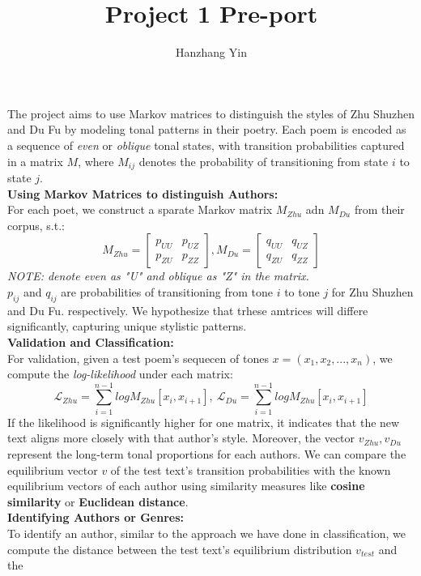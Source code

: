 \documentclass[12pt]{article}
\title{\vspace{-2cm}Project 1 Pre-port}
\author{Hanzhang Yin}
\begin{document}
\maketitle

The project aims to use Markov matrices to distinguish the styles of Zhu Shuzhen and Du Fu by modeling tonal patterns in their poetry.
Each poem is encoded as a sequence of \textit{even} or \textit{oblique} tonal states, with transition probabilities captured in a matrix \( M \), where \( M_{ij} \) denotes the probability of transitioning from state \( i \) to state \( j \).
\\
\textbf{Using Markov Matrices to distinguish Authors: }
\\
For each poet, we construct a sparate Markov matrix $M_{Zhu}$ adn $M_{Du}$ from their corpus, s.t.:
\[ 
    M_{Zhu} = \begin{bmatrix} p_{UU} & p_{UZ} \\ p_{ZU} & p_{ZZ} \end{bmatrix}, M_{Du} = \begin{bmatrix} q_{UU} & q_{UZ} \\ q_{ZU} & q_{ZZ} \end{bmatrix}
\]
\textit{NOTE: denote even as "U" and oblique as "Z" in the matrix.}
\\
$p_{ij}$ and $q_{ij}$ are probabilities of transitioning from tone $i$ to tone $j$ for Zhu Shuzhen and Du Fu. respectively. We hypothesize that trhese amtrices will differe significantly, capturing unique stylistic patterns.
\\
\textbf{Validation and Classification: }
\\
For validation, given a test poem's sequecen of tones $x = (x_1, x_2,...,x_n)$, we compute the \textit{log-likelihood} under each matrix:
\[ \mathcal{L}_{Zhu} = \sum_{i = 1}^{n - 1} log M_{Zhu} [x_i, x_{i + 1}], \ \mathcal{L}_{Du} = \sum_{i = 1}^{n - 1} log M_{Zhu} [x_i, x_{i + 1}] \]
If the likelihood is significantly higher for one matrix, it indicates that the new text aligns more closely with that author's style.
Moreover, the vector $v_{Zhu}, v_{Du}$ represent the long-term tonal proportions for each authors. 
We can compare the equilibrium vector $v$ of the test text's transition probabilities with the known equilibrium vectors of each author using similarity measures like \textbf{cosine similarity} or \textbf{Euclidean distance}.
\\
\textbf{Identifying Authors or Genres: }
\\
To identify an author, similar to the approach we have done in classification, we compute the distance between the test text's equilibrium distribution $v_{test}$ and the 
\end{document}
